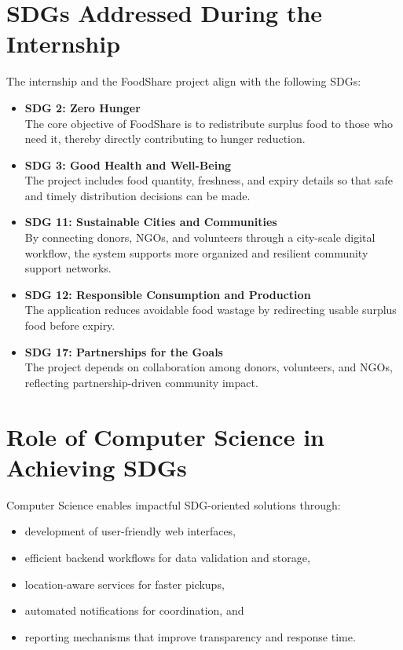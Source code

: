 \documentclass[12pt,a4paper]{report}
\newcommand{\projecttitle}{FoodShare}
\begin{document}
\section{SDGs Addressed During the Internship}
The internship and the \projecttitle{} project align with the following SDGs:

\begin{itemize}[leftmargin=1.2cm,label=\textcolor{sdggreen}{$\triangleright$}]
\item \textbf{SDG 2: Zero Hunger} \\
The core objective of \projecttitle{} is to redistribute surplus food to those who need it, thereby directly contributing to hunger reduction.

\item \textbf{SDG 3: Good Health and Well-Being} \\
The project includes food quantity, freshness, and expiry details so that safe and timely distribution decisions can be made.

\item \textbf{SDG 11: Sustainable Cities and Communities} \\
By connecting donors, NGOs, and volunteers through a city-scale digital workflow, the system supports more organized and resilient community support networks.

\item \textbf{SDG 12: Responsible Consumption and Production} \\
The application reduces avoidable food wastage by redirecting usable surplus food before expiry.

\item \textbf{SDG 17: Partnerships for the Goals} \\
The project depends on collaboration among donors, volunteers, and NGOs, reflecting partnership-driven community impact.
\end{itemize}

\section{Role of Computer Science in Achieving SDGs}
Computer Science enables impactful SDG-oriented solutions through:
\begin{itemize}[leftmargin=1.2cm]
\item development of user-friendly web interfaces,
\item efficient backend workflows for data validation and storage,
\item location-aware services for faster pickups,
\item automated notifications for coordination, and
\item reporting mechanisms that improve transparency and response time.
\end{itemize}
\end{document}
